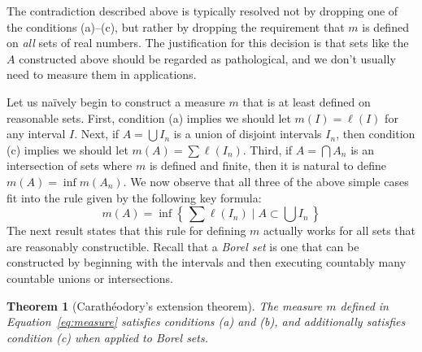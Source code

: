 \documentclass[11pt,oneside]{amsbook}
\newcommand{\set}[1]{\left\{\,#1\,\right\}}
\theoremstyle{definition}
\theoremstyle{plain}
\newtheorem{thm}{Theorem}[section]
\theoremstyle{definition}
\theoremstyle{remark}
\begin{document}
The contradiction described above is typically resolved not by dropping one of the conditions (a)--(c), but rather by dropping the requirement that $m$ is defined on \emph{all} sets of real numbers. The justification for this decision is that sets like the $A$ constructed above should be regarded as pathological, and we don't usually need to measure them in applications.

Let us na\"ively begin to construct a measure $m$ that is at least defined on reasonable sets. First, condition (a) implies we should let $m(I)=\ell(I)$ for any interval $I$. Next, if $A=\bigcup I_n$ is a union of disjoint intervals $I_n$, then condition (c) implies we should let $m(A)=\sum\ell(I_n)$. Third, if $A=\bigcap A_n$ is an intersection of sets where $m$ is defined and finite, then it is natural to define $m(A)=\inf m(A_n)$. We now observe that all three of the above simple cases fit into the rule given by the following key formula:
\begin{equation}
  \label{eq:measure}
  m(A)=\inf\set{\sum\ell(I_n)\mid A\subset\bigcup I_n}
\end{equation}
The next result states that this rule for defining $m$ actually works for all sets that are reasonably constructible. Recall that a \emph{Borel set} is one that can be constructed by beginning with the intervals and then executing countably many countable unions or intersections.

\begin{thm}[Carath\'eodory's extension theorem]
  \label{thm:caratheodory}
  The measure $m$ defined in Equation~\eqref{eq:measure} satisfies conditions (a) and (b), and additionally satisfies condition (c) when applied to Borel sets.
\end{thm}
\end{document}
